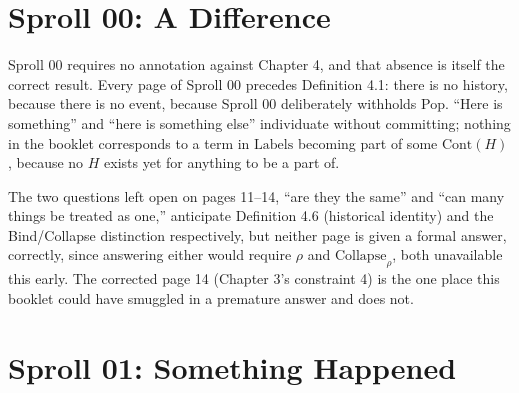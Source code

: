 \documentclass[11pt,twoside]{book}
\begin{document}
\chapter{Sproll 00: A Difference}

Sproll 00 requires no annotation against Chapter 4, and that absence is itself the correct result. Every page of Sproll 00 precedes Definition 4.1: there is no history, because there is no event, because Sproll 00 deliberately withholds Pop. ``Here is something'' and ``here is something else'' individuate without committing; nothing in the booklet corresponds to a term in $\mathrm{Labels}$ becoming part of some $\mathrm{Cont}(H)$, because no $H$ exists yet for anything to be a part of.

The two questions left open on pages 11--14, ``are they the same'' and ``can many things be treated as one,'' anticipate Definition 4.6 (historical identity) and the Bind/Collapse distinction respectively, but neither page is given a formal answer, correctly, since answering either would require $\rho$ and $\mathrm{Collapse}_\rho$, both unavailable this early. The corrected page 14 (Chapter 3's constraint 4) is the one place this booklet could have smuggled in a premature answer and does not.

\chapter{Sproll 01: Something Happened}
\end{document}
